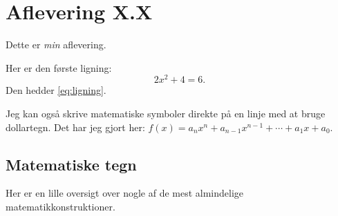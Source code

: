 \documentclass[a4paper,12pt,oneside,article]{memoir}
\begin{document}


\chapter*{Aflevering X.X} %

Dette er \emph{min} aflevering.

Her er den første ligning:
\begin{equation}
	2x^2+4=6.\label{eq:ligning}
\end{equation}
Den hedder \eqref{eq:ligning}.

Jeg kan også skrive matematiske symboler direkte på en linje med at bruge dollartegn. Det har jeg gjort her: $f(x) = a_{n} x^{n} + a_{n-1}x^{n-1}+\cdots +a_{1}x + a_{0}$.

\section*{Matematiske tegn}
Her er en lille oversigt over nogle af de mest almindelige matematikkonstruktioner.
\end{document}
